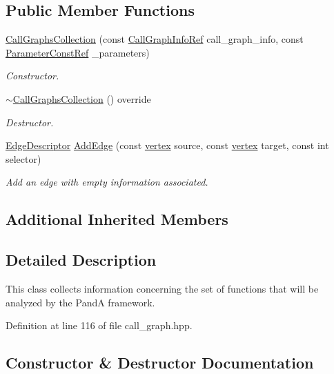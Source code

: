 \subsection*{Public Member Functions}
\begin{DoxyCompactItemize}
\item 
\hyperlink{classCallGraphsCollection_aadb82660b67e7b7821cc4b0418786f5d}{Call\+Graphs\+Collection} (const \hyperlink{call__graph_8hpp_a3259d849c69d9d111ec0c5178d9b32af}{Call\+Graph\+Info\+Ref} call\+\_\+graph\+\_\+info, const \hyperlink{Parameter_8hpp_a37841774a6fcb479b597fdf8955eb4ea}{Parameter\+Const\+Ref} \+\_\+parameters)
\begin{DoxyCompactList}\small\item\em Constructor. \end{DoxyCompactList}\item 
\hyperlink{classCallGraphsCollection_af8cacb85b589000d5ad2aa5f0a804489}{$\sim$\+Call\+Graphs\+Collection} () override
\begin{DoxyCompactList}\small\item\em Destructor. \end{DoxyCompactList}\item 
\hyperlink{graph_8hpp_a9eb9afea34e09f484b21f2efd263dd48}{Edge\+Descriptor} \hyperlink{classCallGraphsCollection_a8b58f9e18e88261160563162622a8148}{Add\+Edge} (const \hyperlink{graph_8hpp_abefdcf0544e601805af44eca032cca14}{vertex} source, const \hyperlink{graph_8hpp_abefdcf0544e601805af44eca032cca14}{vertex} target, const int selector)
\begin{DoxyCompactList}\small\item\em Add an edge with empty information associated. \end{DoxyCompactList}\end{DoxyCompactItemize}
\subsection*{Additional Inherited Members}


\subsection{Detailed Description}
This class collects information concerning the set of functions that will be analyzed by the PandA framework. 

Definition at line 116 of file call\+\_\+graph.\+hpp.



\subsection{Constructor \& Destructor Documentation}
\mbox{\label{classCallGraphsCollection_aadb82660b67e7b7821cc4b0418786f5d}} 
